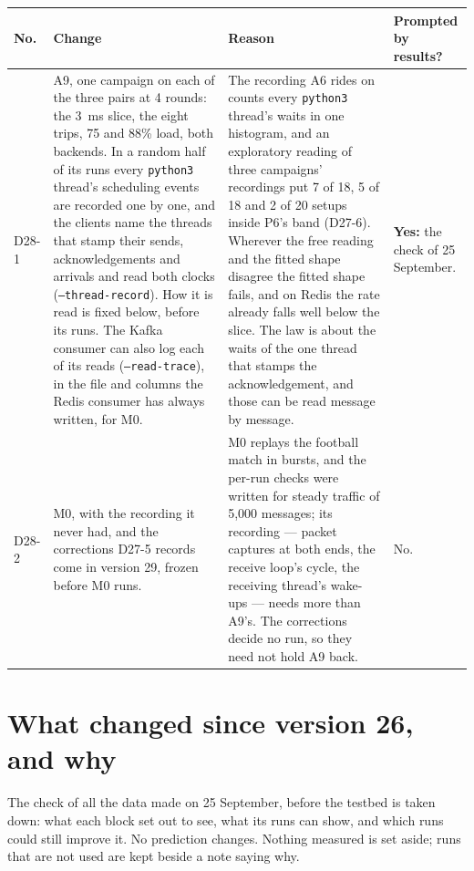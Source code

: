 \documentclass[11pt]{article}
\begin{document}
{\small
\begin{longtable}{@{}p{1.1cm} >{\raggedright\arraybackslash}p{6.1cm} >{\raggedright\arraybackslash}p{6.0cm} >{\raggedright\arraybackslash}p{2.2cm}@{}}
\toprule
\textbf{No.} & \textbf{Change} & \textbf{Reason} & \textbf{Prompted by results?} \\
\midrule
\endhead
D28-1 & A9, one campaign on each of the three pairs at 4 rounds: the 3~ms slice, the eight trips, 75 and 88\% load, both backends. In a random half of its runs every \texttt{python3} thread's scheduling events are recorded one by one, and the clients name the threads that stamp their sends, acknowledgements and arrivals and read both clocks (\texttt{--thread-record}). How it is read is fixed below, before its runs. The Kafka consumer can also log each of its reads (\texttt{--read-trace}), in the file and columns the Redis consumer has always written, for M0. & The recording A6 rides on counts every \texttt{python3} thread's waits in one histogram, and an exploratory reading of three campaigns' recordings put 7 of 18, 5 of 18 and 2 of 20 setups inside P6's band (D27-6). Wherever the free reading and the fitted shape disagree the fitted shape fails, and on Redis the rate already falls well below the slice. The law is about the waits of the one thread that stamps the acknowledgement, and those can be read message by message. & \textbf{Yes:} the check of 25 September. \\
D28-2 & M0, with the recording it never had, and the corrections D27-5 records come in version 29, frozen before M0 runs. & M0 replays the football match in bursts, and the per-run checks were written for steady traffic of 5,000 messages; its recording --- packet captures at both ends, the receive loop's cycle, the receiving thread's wake-ups --- needs more than A9's. The corrections decide no run, so they need not hold A9 back. & No. \\
\bottomrule
\end{longtable}}

\section*{What changed since version 26, and why}
The check of all the data made on 25 September, before the testbed is taken down: what each
block set out to see, what its runs can show, and which runs could still improve it. No
prediction changes. Nothing measured is set aside; runs that are not used are kept beside a
note saying why.
\end{document}
